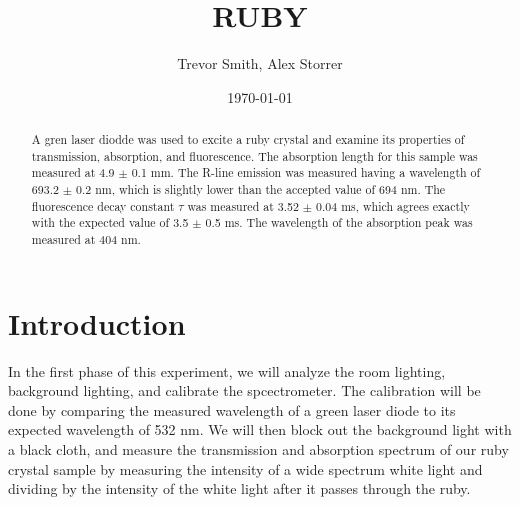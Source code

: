 \documentclass[aps,prl,reprint]{revtex4-2}
\begin{document}

\title{RUBY}


\author{Trevor Smith, Alex Storrer}


\date{\today}

\begin{abstract}
	A gren laser diodde was used to excite a ruby crystal and examine its properties
	of transmission, absorption, and fluorescence.  The absorption length for
	this sample was measured
	at 4.9 $\pm$ 0.1 mm. The R-line emission was measured having a wavelength of 
	693.2 $\pm$ 0.2 nm, which is slightly lower than the accepted value of 694 nm.
	The fluorescence decay constant $\tau$ was measured at 3.52 $\pm$ 0.04 ms, which
	agrees exactly with the expected value of 3.5 $\pm$ 0.5 ms. The wavelength
	of the absorption peak was measured at 404 nm. 
\end{abstract}


\maketitle

\section{Introduction}
In the first phase of this experiment, we will analyze the room lighting, background 
lighting, and calibrate the spcectrometer. The calibration will be done by comparing
the measured wavelength of a green laser diode to its expected wavelength of 532 nm. 
We will then block out the background light with a black cloth, and
measure the transmission and absorption spectrum of our ruby crystal sample
by measuring the intensity of a wide spectrum white light and dividing by the 
intensity of the white light after it passes through the ruby. \\
\end{document}
